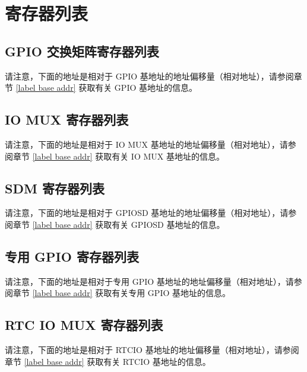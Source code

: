 \documentclass[main\_\_CN.tex]{subfiles}
\begin{document}
\hypertarget{iomuxgpio-reg-summ}{}
\section{寄存器列表}


\subsection{GPIO 交换矩阵寄存器列表}

请注意，下面的地址是相对于 GPIO 基地址的地址偏移量（相对地址），请参阅章节 \ref{label base addr} 获取有关 GPIO 基地址的信息。
\label{section:4.12}



\subsection{IO MUX 寄存器列表}

请注意，下面的地址是相对于 IO MUX 基地址的地址偏移量（相对地址），请参阅章节 \ref{label base addr} 获取有关 IO MUX 基地址的信息。



\subsection{SDM 寄存器列表}

请注意，下面的地址是相对于 GPIOSD 基地址的地址偏移量（相对地址），请参阅章节 \ref{label base addr} 获取有关 GPIOSD 基地址的信息。



\subsection{专用 GPIO 寄存器列表}

请注意，下面的地址是相对于专用 GPIO 基地址的地址偏移量（相对地址），请参阅章节 \ref{label base addr} 获取有关专用 GPIO 基地址的信息。



\subsection{RTC IO MUX 寄存器列表}
请注意，下面的地址是相对于 RTCIO 基地址的地址偏移量（相对地址），请参阅章节 \ref{label base addr} 获取有关 RTCIO 基地址的信息。

\end{document}
